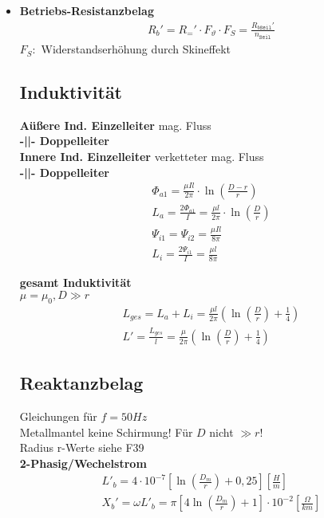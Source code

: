 \begin{itemize}
\item[]{\textbf{Betriebs-Resistanzbelag}}
\begin{gather*}
    R_{b}' = R_{=}' \cdot F_{\vartheta} \cdot F_{S} = \frac{R_{b\mathtt{Seil}}'}{n_{\mathtt{Seil}}}
\end{gather*}
$F_S:$ Widerstandserhöhung durch Skineffekt
\newpage

\subsection{Induktivität}
\textbf{Aüßere Ind. Einzelleiter} \textcolor{dgreen}{mag. Fluss}\\
\textbf{-||- Doppelleiter}\\
\textbf{Innere Ind. Einzelleiter} \textcolor{dgreen}{verketteter mag. Fluss}\\
\textbf{-||- Doppelleiter}
\begin{gather*}
    \Phi_{a1} = \frac{\mu I l}{2 \pi} \cdot \ln \left( \frac{D-r}{r}\right)\\
    L_{a} = \frac{2\Phi_{a1}}{I} = \frac{\mu l}{2 \pi} \cdot \ln \left( \frac{D}{r}\right)\\
    \Psi_{i1} = \Psi_{i2} = \frac{\mu I l}{8 \pi}\\
    L_{i} = \frac{2\Psi_{i1}}{I} = \frac{\mu l}{8 \pi}
\end{gather*}

\textbf{gesamt Induktivität}\\
\textcolor{dgreen}{$\mu = \mu_{0}, D \gg r$}
\begin{gather*}
    L_{ges} = L_{a} + L_{i} = \frac{\mu l}{2\pi} \left( \ln \left(\frac{D}{r}\right) + \frac{1}{4}\right)\\
    L' = \frac{L_{ges}}{l} = \frac{\mu }{2\pi} \left( \ln \left(\frac{D}{r}\right) + \frac{1}{4}\right)
\end{gather*}

\subsection{Reaktanzbelag}
Gleichungen für $f=50 \mathit{Hz}$\\
Metallmantel keine Schirmung! Für $D$ nicht $\gg r$!\\
Radius r-Werte siehe F39\\

\textbf{2-Phasig/Wechelstrom}
\begin{gather*}
    L'_b = 4\cdot 10^{-7} \left[ \ln \left( \frac{D_m}{r} \right) + 0,25 \right] \left[\frac{H}{m} \right] \\
    X_{b}'= \omega L'_b = \pi \left[ 4 \ln \left( \frac{D_m}{r}\right) +1 \right] \cdot 10 ^{-2}   \left[\frac{\Omega}{km}\right]
\end{gather*}


\end{itemize}
